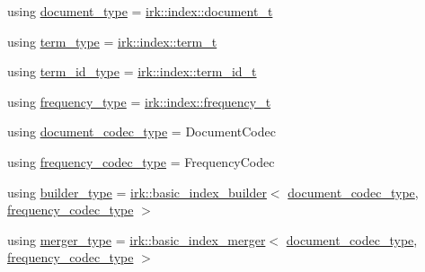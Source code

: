\begin{DoxyCompactItemize}
\item 
using \mbox{\hyperlink{classirk_1_1index_1_1basic__index__assembler_ae4f97ba949d5359dc425b034f6fc319d}{document\+\_\+type}} = \mbox{\hyperlink{namespaceirk_1_1index_af829dedea20da89f9b51b49d78f57006}{irk\+::index\+::document\+\_\+t}}
\item 
using \mbox{\hyperlink{classirk_1_1index_1_1basic__index__assembler_ad748f84f622d5a988c5bf02478ab4686}{term\+\_\+type}} = \mbox{\hyperlink{namespaceirk_1_1index_a7c2517c1f98e5b5f30ba3ab2f837caf6}{irk\+::index\+::term\+\_\+t}}
\item 
using \mbox{\hyperlink{classirk_1_1index_1_1basic__index__assembler_ad14cbad92a385bd06c0d16b38ab771ec}{term\+\_\+id\+\_\+type}} = \mbox{\hyperlink{namespaceirk_1_1index_ae2ce3a02969196fe6dab4443ed2007d5}{irk\+::index\+::term\+\_\+id\+\_\+t}}
\item 
using \mbox{\hyperlink{classirk_1_1index_1_1basic__index__assembler_a5e340ecba42926be7121502bdcaec26e}{frequency\+\_\+type}} = \mbox{\hyperlink{namespaceirk_1_1index_aa2cb48e79abd95deb25bbdf36c0ea70f}{irk\+::index\+::frequency\+\_\+t}}
\item 
using \mbox{\hyperlink{classirk_1_1index_1_1basic__index__assembler_ac64a6ddbef809f5c8b6eafffa9c8130d}{document\+\_\+codec\+\_\+type}} = Document\+Codec
\item 
using \mbox{\hyperlink{classirk_1_1index_1_1basic__index__assembler_a2a415182287d7c48e7c6bf8d0c70a06f}{frequency\+\_\+codec\+\_\+type}} = Frequency\+Codec
\item 
using \mbox{\hyperlink{classirk_1_1index_1_1basic__index__assembler_a2487a04584addbc8e6809cffae653176}{builder\+\_\+type}} = \mbox{\hyperlink{classirk_1_1basic__index__builder}{irk\+::basic\+\_\+index\+\_\+builder}}$<$ \mbox{\hyperlink{classirk_1_1index_1_1basic__index__assembler_ac64a6ddbef809f5c8b6eafffa9c8130d}{document\+\_\+codec\+\_\+type}}, \mbox{\hyperlink{classirk_1_1index_1_1basic__index__assembler_a2a415182287d7c48e7c6bf8d0c70a06f}{frequency\+\_\+codec\+\_\+type}} $>$
\item 
using \mbox{\hyperlink{classirk_1_1index_1_1basic__index__assembler_ade53519f2f70e2c1d66a2451a76259b0}{merger\+\_\+type}} = \mbox{\hyperlink{classirk_1_1basic__index__merger}{irk\+::basic\+\_\+index\+\_\+merger}}$<$ \mbox{\hyperlink{classirk_1_1index_1_1basic__index__assembler_ac64a6ddbef809f5c8b6eafffa9c8130d}{document\+\_\+codec\+\_\+type}}, \mbox{\hyperlink{classirk_1_1index_1_1basic__index__assembler_a2a415182287d7c48e7c6bf8d0c70a06f}{frequency\+\_\+codec\+\_\+type}} $>$
\end{DoxyCompactItemize}
